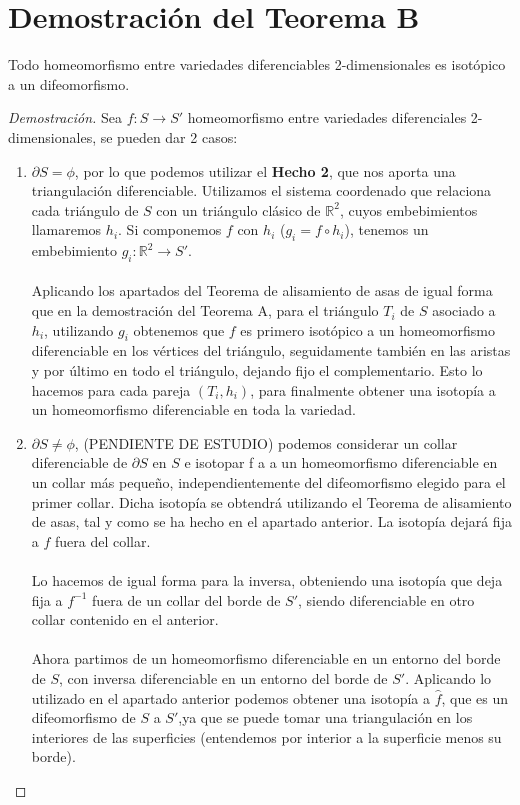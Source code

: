 \section{Demostración del Teorema B}
	\begin{teorb}
		Todo homeomorfismo entre variedades diferenciables 2-dimensionales es isotópico a un difeomorfismo.
	\end{teorb}
	\begin{proof}[Demostración]
		Sea $f: S \rightarrow S'$ homeomorfismo entre variedades diferenciales 2-dimensionales, se pueden dar 2 casos:
		\begin{enumerate}
			\item $\partial S = \phi$, por lo que podemos utilizar el \textbf{Hecho 2}, que nos aporta una triangulación diferenciable. Utilizamos el sistema coordenado que relaciona cada triángulo de $S$ con un triángulo clásico de $\mathbb{R}^2$, cuyos embebimientos llamaremos $h_i$. Si componemos $f$ con $h_i$ ($g_i=f\circ h_i$), tenemos un embebimiento $g_i: \mathbb{R}^2 \rightarrow S'$.\\
			\\ Aplicando los apartados del Teorema de alisamiento de asas de igual forma que en la demostración del Teorema A, para el triángulo $T_i$ de $S$ asociado a $h_i$, utilizando $g_i$ obtenemos que $f$ es primero isotópico a un homeomorfismo diferenciable en los vértices del triángulo, seguidamente también en las aristas y por último en todo el triángulo, dejando fijo el complementario. Esto lo hacemos para cada pareja $(T_i, h_i)$, para finalmente obtener una isotopía a un homeomorfismo diferenciable en toda la variedad.
			\item $\partial S \neq \phi$, (PENDIENTE DE ESTUDIO) podemos considerar un collar diferenciable de $\partial S$ en $S$ e isotopar f a a un homeomorfismo diferenciable en un collar más pequeño, independientemente del difeomorfismo elegido para el primer collar. Dicha isotopía se obtendrá utilizando el Teorema de alisamiento de asas, tal y como se ha hecho en el apartado anterior. La isotopía dejará fija a $f$ fuera del collar.\\
			\\  Lo hacemos de igual forma para la inversa, obteniendo una isotopía que deja fija a $f^{-1}$ fuera de un collar del borde de $S'$, siendo diferenciable en otro collar contenido en el anterior.\\
			\\ Ahora partimos de un homeomorfismo diferenciable en un entorno del borde de $S$, con inversa diferenciable en un entorno del borde de $S'$. Aplicando lo utilizado en el apartado anterior podemos obtener una isotopía a $\widehat{f}$, que es un difeomorfismo de $S$ a $S'$,ya que se puede tomar una triangulación en los interiores de las superficies (entendemos por interior a la superficie menos su borde).
		\end{enumerate}
	\end{proof}
\endinput
